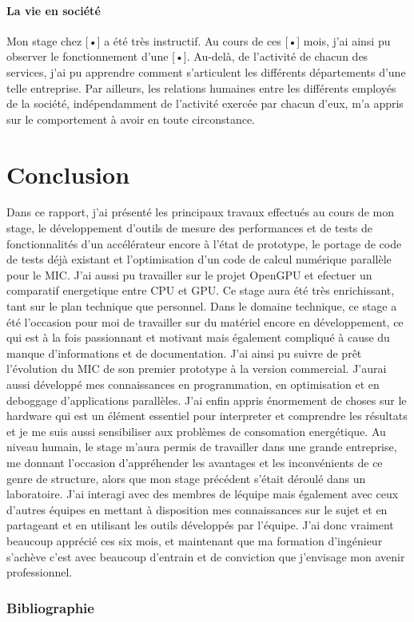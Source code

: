 \documentclass[11pt]{article}
\begin{document}
		\subsection{La vie en société}
		Mon stage chez [•] a été très instructif. Au cours de ces [•] mois, j’ai ainsi pu observer le fonctionnement 
		d’une [•]. Au-delà, de l’activité de chacun des services, j’ai pu apprendre comment s’articulent les différents 
		départements d’une telle entreprise. Par ailleurs, les relations humaines entre les différents employés de la 
		société, indépendamment de l’activité exercée par chacun d’eux, m’a appris sur le comportement à avoir en toute 
		circonstance.
\newpage
{}
\part{Conclusion}
Dans ce rapport, j'ai présenté les principaux travaux effectués au cours de mon stage, le développement d'outils de mesure des 
performances et de tests de fonctionnalités d'un accélérateur encore à l'état de prototype, le portage de code de tests déjà 
existant et l'optimisation d'un code de calcul numérique parallèle pour le MIC. J'ai aussi pu travailler sur le projet OpenGPU 
et efectuer un comparatif energetique entre CPU et GPU. Ce stage aura été très enrichissant, tant sur le plan 
technique que personnel. \newline
\newline
Dans le domaine technique, ce stage a été l'occasion pour moi de travailler sur du matériel encore en développement, ce qui est 
à la fois passionnant et motivant mais également compliqué à cause du manque d'informations et de documentation. J'ai ainsi pu 
suivre de prêt l'évolution du MIC de son premier prototype à la version commercial. J'aurai aussi développé mes connaissances en 
programmation, en optimisation et en deboggage d'applications parallèles. J'ai enfin appris énormement de choses sur le hardware 
qui est un élément essentiel pour interpreter et comprendre les résultats et je me suis aussi sensibiliser aux problèmes de consomation 
energétique. \newline
\newline
Au niveau humain, le stage m'aura permis de travailler dans une grande entreprise, me donnant l'occasion
d'appréhender les avantages et les inconvénients de ce genre de structure, alors que mon stage précédent s'était déroulé dans 
un laboratoire. J'ai interagi avec des membres de léquipe mais également avec ceux d'autres équipes en mettant à disposition 
mes connaissances sur le sujet et en partageant et en utilisant les outils développés par l'équipe. \newline
\newline
J'ai donc vraiment beaucoup apprécié ces six mois, et maintenant que ma formation d'ingénieur
s'achève c'est avec beaucoup d'entrain et de conviction que j'envisage mon avenir professionnel.

\newpage
{}
\appendix
\section{Bibliographie}
\end{document}
